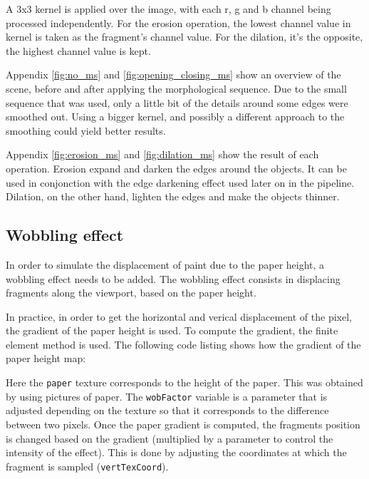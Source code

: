 \documentclass{article}
\begin{document}
\medskip \par
\noindent
A 3x3 kernel is applied over the image, with each r, g and b channel being processed independently. For the 
erosion operation, the lowest channel value in kernel is taken as the fragment's channel value. 
For the dilation, it's the opposite, the highest channel value is kept.

\newpage
\noindent
Appendix \ref{fig:no_ms} and \ref{fig:opening_closing_ms} show an overview of the scene, before and after 
applying the morphological sequence. Due to the small sequence that was used, only a little bit of the 
details around some edges were smoothed out. Using a bigger kernel, and possibly a different approach to 
the smoothing could yield better results. 

\medskip \par
\noindent
Appendix \ref{fig:erosion_ms} and \ref{fig:dilation_ms} show the result of each operation. 
Erosion expand and darken the edges around the objects. It can be used in conjonction with the edge darkening 
effect used later on in the pipeline. Dilation, on the other hand, 
lighten the edges and make the objects thinner.

\subsection{Wobbling effect}
In order to simulate the displacement of paint due to the paper height, a wobbling effect needs to be added. The wobbling effect consists in displacing fragments along the viewport, based on the paper height.

\medskip \par
\noindent
In practice, in order to get the horizontal and verical displacement of the pixel, the gradient of the paper height is used. To compute the gradient, the finite element method is used. The following code listing shows how the gradient of the paper height map:


\medskip \par
\noindent
Here the \verb|paper| texture corresponds to the height of the paper. This was obtained by using pictures of paper. The \verb|wobFactor| variable is a parameter that is adjusted depending on the texture so that it corresponds to the difference between two pixels. Once the paper gradient is computed, the fragments position is changed based on the gradient (multiplied by a parameter to control the intensity of the effect). This is done by adjusting the coordinates at which the fragment is sampled (\verb|vertTexCoord|).
\end{document}
